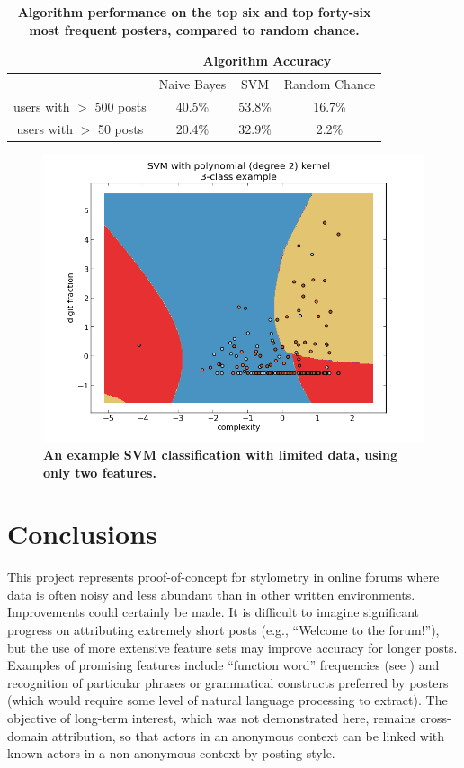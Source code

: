 \documentclass[12pt,letterpaper,onecolumn,oneside]{article}
\numberwithin{equation}{section}
\numberwithin{figure}{section}
\begin{document}
\begin{table}
\begin{center}
  \begin{tabular}{| c | c | c | c |}
    \hline
      & \multicolumn{3}{|c|}{Algorithm Accuracy} \\
    \hline
     & Naive Bayes & SVM & Random Chance \\ \hline
    users with \(>\) 500 posts & 40.5\% & 53.8\% & 16.7\% \\ \hline
    users with \(>\) 50 posts & 20.4\% & 32.9\% & 2.2\% \\ \hline
  \end{tabular}
  \caption{\textbf{\footnotesize{Algorithm performance on the top six and top forty-six most frequent posters, compared to random chance.}}}
  \label{numbers}
\end{center}
\end{table}

\begin{figure}[H]
 \centering
  \includegraphics[scale=0.4]{SVMpic.png}
  \caption{\textbf{\footnotesize{An example SVM classification with limited data, using only two features.}}}
  \label{SVM_pic}
\end{figure}

\section{Conclusions}
This project represents proof-of-concept for stylometry in online forums where data is often noisy and less abundant than in other written environments. Improvements could certainly be made. It is difficult to 
imagine significant progress on attributing extremely short posts (e.g., ``Welcome to the forum!''), but the use of more extensive feature sets may improve accuracy for longer posts. Examples of promising features 
include ``function word'' frequencies (see \cite{stanford}) and recognition of particular phrases or grammatical constructs preferred by posters (which would require some level of natural language processing to 
extract). The objective of long-term interest, which was not demonstrated here, remains cross-domain attribution, so that actors in an anonymous context can be linked with known actors in a non-anonymous context by 
posting style.
\end{document}

